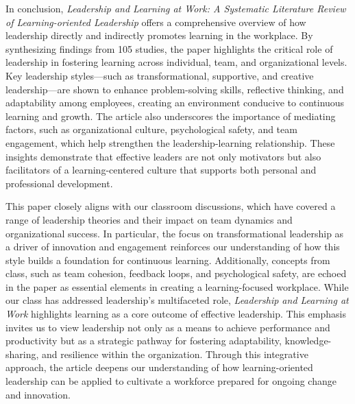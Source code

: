 In conclusion, \textit{Leadership and Learning at Work: A Systematic Literature Review of
Learning-oriented Leadership} offers a comprehensive overview of how leadership directly and
indirectly promotes learning in the workplace. By synthesizing findings from 105 studies, the paper
highlights the critical role of leadership in fostering learning across individual, team, and
organizational levels. Key leadership styles—such as transformational, supportive, and creative
leadership—are shown to enhance problem-solving skills, reflective thinking, and adaptability among
employees, creating an environment conducive to continuous learning and growth. The article also
underscores the importance of mediating factors, such as organizational culture, psychological
safety, and team engagement, which help strengthen the leadership-learning relationship. These
insights demonstrate that effective leaders are not only motivators but also facilitators of a
learning-centered culture that supports both personal and professional development.

This paper closely aligns with our classroom discussions, which have covered a range of leadership
theories and their impact on team dynamics and organizational success. In particular, the focus on
transformational leadership as a driver of innovation and engagement reinforces our understanding of
how this style builds a foundation for continuous learning. Additionally, concepts from class, such
as team cohesion, feedback loops, and psychological safety, are echoed in the paper as essential
elements in creating a learning-focused workplace. While our class has addressed leadership's
multifaceted role, \textit{Leadership and Learning at Work} highlights learning as a core outcome of
effective leadership. This emphasis invites us to view leadership not only as a means to achieve
performance and productivity but as a strategic pathway for fostering adaptability,
knowledge-sharing, and resilience within the organization. Through this integrative approach, the
article deepens our understanding of how learning-oriented leadership can be applied to cultivate a
workforce prepared for ongoing change and innovation.
